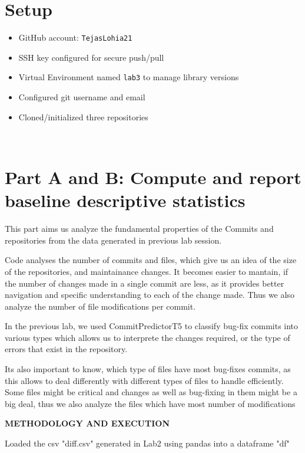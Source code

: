 \documentclass[12pt, a4paper]{report}
\newcommand{\sectionbar}[1]{%
  \vspace{0.6\baselineskip}%
  \noindent
  \colorbox{sectionbar}{%
    \parbox{\dimexpr\linewidth-2\fboxsep\relax}{%
      \textbf{\Large\textsf{#1}}%
    }%
  }%
  \vspace{0.6\baselineskip}
}
\begin{document}
\section{Setup}

\begin{itemize}
    \item GitHub account: \texttt{TejasLohia21}
    \item SSH key configured for secure push/pull
    \item Virtual Environment named \texttt{lab3} to manage library versions
    \item Configured git username and email
    \item Cloned/initialized three repositories
\end{itemize}

\
\section{Part A and B: Compute and report baseline descriptive statistics}

This part aims us analyze the fundamental properties of the Commits and repositories from the data generated in previous lab session.

Code analyses the number of commits and files, which give us an idea of the size of the repositories, and maintainance changes. It becomes easier to mantain, if the number of changes made in a single commit are less, as it provides better navigation and specific understanding to each of the change made. 
Thus we also analyze the number of file modifications per commit. 

In the previous lab, we used CommitPredictorT5 to classify bug-fix commits into various types which allows us to interprete the changes required, or the type of errors that exist in the repository. 

Its also important to know, which type of files have most bug-fixes commits, as this allows to deal differently with different types of files to handle efficiently. Some files might be critical and changes as well as bug-fixing in them might be a big deal, thus we also analyze the files which have most number of modifications

\sectionbar{METHODOLOGY AND EXECUTION}

Loaded the csv "diff.csv" generated in Lab2 using pandas into a dataframe "df"
\end{document}
